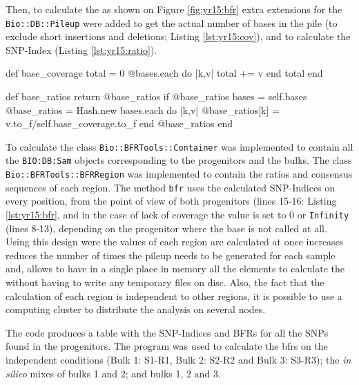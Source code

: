 Then, to calculate the  as shown on Figure \ref{fig:yr15:bfr} extra extensions for the \texttt{Bio::DB::Pileup} were added to get the actual number of bases in the pile (to exclude short insertions and deletions; Listing \ref{lst:yr15:cov}), and to calculate the SNP-Index (Listing \ref{lst:yr15:ratio}).  

\begin{code}[language=Ruby,caption=\texttt{base\_coverage} gets the number of bases called from a single pileup., label=lst:yr15:cov]
def base_coverage
  total = 0
  @bases.each do |k,v|
    total += v  
  end
  total
end
\end{code}

\begin{code}[language=Ruby,caption=\texttt{base\_ratios} gets the SNP-Index on a single pileup., label=lst:yr15:ratio]
def base_ratios
  return @base_ratios if @base_ratios
  bases = self.bases
  @base_ratios = Hash.new
  bases.each do |k,v| 
    @base_ratios[k] = v.to_f/self.base_coverage.to_f 
  end
  @base_ratios
 end
\end{code}

To calculate  the class \texttt{Bio::BFRTools::Container} was implemented to contain all the \texttt{BIO:DB:Sam} objects corresponding to the progenitors and the bulks. 
The class \texttt{Bio::BFRTools::BFRRegion}  was implemented to contain the ratios and consensus sequences of each region. 
The method \texttt{bfr} uses the calculated SNP-Indices on every position, from the point of view of both progenitors (lines 15-16: Listing \ref{lst:yr15:bfr}, and in the case of lack of coverage the value is set to 0 or \texttt{Infinity} (lines 8-13), depending on the progenitor where the base is not called at all. 
Using this design were the values of each region are calculated at once increases reduces the number of times the pileup needs to be generated for each sample and, allows to have in a single place in memory all the elements to calculate the  without having to write any temporary files on disc. 
Also, the fact that the calculation of each region is independent to other regions, it is possible to use a computing cluster to distribute the analysis on several nodes.

The code produces a table with the SNP-Indices and BFRs for all the SNPs found in the progenitors. 
The program was used to calculate the \glspl{bfr} on the independent conditions (Bulk 1: S1-R1, Bulk 2: S2-R2 and Bulk 3: S3-R3); the \textit{in silico} mixes of bulks 1 and 2; and bulks 1, 2 and 3. 



